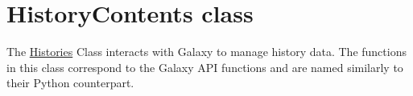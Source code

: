 \hypertarget{group__history__contents__class}{}\section{History\+Contents class}
\label{group__history__contents__class}
The \hyperlink{classHistories}{Histories} Class interacts with Galaxy to manage history data. The functions in this class correspond to the Galaxy A\+PI functions and are named similarly to their Python counterpart. 
